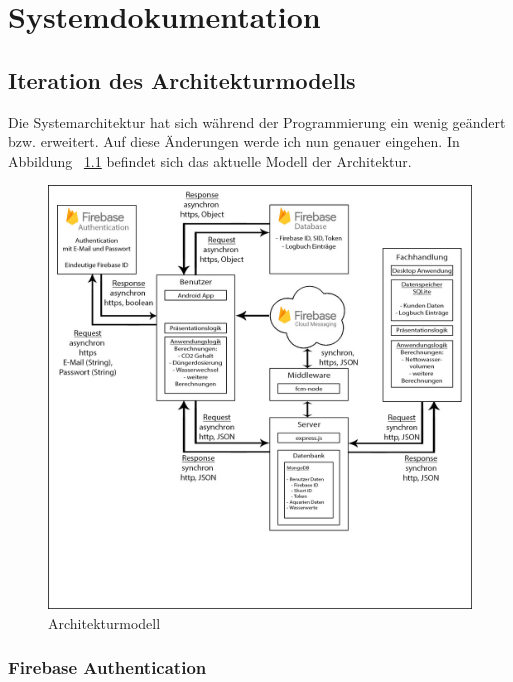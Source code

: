 \chapter{Systemdokumentation}

\section{Iteration des Architekturmodells}

Die Systemarchitektur hat sich während der Programmierung ein wenig geändert bzw. erweitert. Auf diese Änderungen werde ich nun genauer eingehen. In Abbildung ~\ref{architektur} befindet sich das aktuelle Modell der Architektur.

\begin{figure}[htbp]
\centering
\includegraphics[width=\linewidth]{Architektur}
\caption{Architekturmodell}
\label{architektur}
\end{figure}

\subsection{Firebase Authentication}


